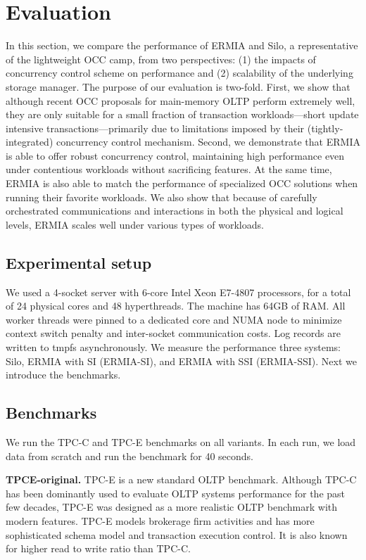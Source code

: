 
\section{Evaluation}
In this section, we compare the performance of ERMIA and Silo, a representative of the lightweight OCC camp, from two perspectives: (1) the impacts of concurrency control scheme on performance and (2) scalability of the underlying storage manager. The purpose of our evaluation is two-fold. First, we show that although recent OCC proposals for main-memory OLTP perform extremely well, they are only suitable for a small fraction of transaction workloads---short update intensive transactions---primarily due to limitations imposed by their (tightly-integrated) concurrency control mechanism. Second, we demonstrate that ERMIA is able to offer robust concurrency control, maintaining high performance even under contentious workloads without sacrificing features. At the same time, ERMIA is also able to match the performance of specialized OCC solutions when running their favorite workloads. We also show that because of carefully orchestrated communications and interactions in both the physical and logical levels, ERMIA scales well under various types of workloads.

\subsection{Experimental setup}
We used a 4-socket server with 6-core Intel Xeon E7-4807 processors, for a total of 24 physical cores and 48 hyperthreads. The machine has 64GB of RAM. All worker threads were pinned to a dedicated core and NUMA node to minimize context switch penalty and inter-socket communication costs. Log records are written to tmpfs asynchronously. We measure the performance three systems: Silo, ERMIA with SI (ERMIA-SI), and ERMIA with SSI (ERMIA-SSI). Next we introduce the benchmarks.

\subsection{Benchmarks}
We run the TPC-C and TPC-E benchmarks on all variants. In each run, we load data from scratch and run the benchmark for 40 seconds.


\textbf{TPCE-original.}
TPC-E is a new standard OLTP benchmark. Although TPC-C has been dominantly used to evaluate OLTP systems performance for the past few decades, TPC-E was designed as a more realistic OLTP benchmark with modern features. TPC-E models brokerage firm activities and has more sophisticated schema model and transaction execution control\cite{TPCE}. It is also known for higher read to write ratio than TPC-C.


